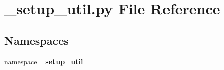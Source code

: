 \section{\-\_\-setup\-\_\-util.\-py \-File \-Reference}
\label{__setup__util_8py}
\subsection*{\-Namespaces}
\begin{DoxyCompactItemize}
\item 
namespace {\bf \-\_\-setup\-\_\-util}
\end{DoxyCompactItemize}
